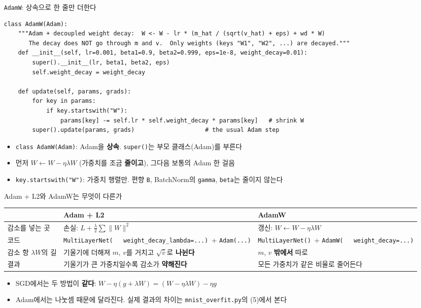 \documentclass[aspectratio=169,11pt]{beamer}
\newcommand{\codesmall}{\ttfamily\fontsize{7.4}{8.3}\selectfont}
\newcommand{\code}[1]{\texttt{#1}}
\begin{document}
\begin{frame}[fragile]{\code{AdamW}: 상속으로 한 줄만 더한다}
\begin{lstlisting}[basicstyle=\codesmall]
class AdamW(Adam):
    """Adam + decoupled weight decay:  W <- W - lr * (m_hat / (sqrt(v_hat) + eps) + wd * W)
       The decay does NOT go through m and v.  Only weights (keys "W1", "W2", ...) are decayed."""
    def __init__(self, lr=0.001, beta1=0.9, beta2=0.999, eps=1e-8, weight_decay=0.01):
        super().__init__(lr, beta1, beta2, eps)
        self.weight_decay = weight_decay

    def update(self, params, grads):
        for key in params:
            if key.startswith("W"):
                params[key] -= self.lr * self.weight_decay * params[key]   # shrink W
        super().update(params, grads)                    # the usual Adam step
\end{lstlisting}
\begin{itemize}
\item \code{class AdamW(Adam)}: Adam을 \textbf{상속}. \code{super()}는 부모 클래스(Adam)를 부른다
\item 먼저 $W \leftarrow W - \eta\lambda W$ (가중치를 조금 \textbf{줄이고}), 그다음 보통의 Adam 한 걸음
\item \code{key.startswith("W")}: 가중치 행렬만. 편향 \code{B}, BatchNorm의 \code{gamma}, \code{beta}는 줄이지 않는다
\end{itemize}
\end{frame}

\begin{frame}{Adam + L2와 AdamW는 무엇이 다른가}
\centering
\small
\renewcommand{\arraystretch}{1.4}
\begin{tabular}{>{\raggedright}p{3.0cm}>{\raggedright}p{4.8cm}>{\raggedright\arraybackslash}p{4.8cm}}
\toprule
& \textbf{Adam + L2} & \textbf{AdamW} \\
\midrule
감소를 넣는 곳 & 손실: $L+\frac\lambda2\sum\|W\|^2$ & 갱신: $W\leftarrow W-\eta\lambda W$ \\
코드 & {\footnotesize\code{MultiLayerNet(}\ \code{\ \ weight\_decay\_lambda=...)}\ + \code{Adam(...)}} & {\footnotesize\code{MultiLayerNet()}\ + \code{AdamW(}\ \code{\ \ weight\_decay=...)}} \\
감소 항 $\lambda W$의 길 & 기울기에 더해져 $m$, $v$를 거치고 $\sqrt{\hat v}$로 \textbf{나뉜다} & $m$, $v$ \textbf{밖에서} 따로 \\
결과 & 기울기가 큰 가중치일수록 감소가 \textbf{약해진다} & 모든 가중치가 같은 비율로 줄어든다 \\
\bottomrule
\end{tabular}
\raggedright
\begin{itemize}
\item SGD에서는 두 방법이 \textbf{같다}: $W - \eta(g+\lambda W) = (W-\eta\lambda W) - \eta g$
\item Adam에서는 나눗셈 때문에 달라진다. 실제 결과의 차이는 \code{mnist\_overfit.py}의 (5)에서 본다
\end{itemize}
\end{frame}
\end{document}
